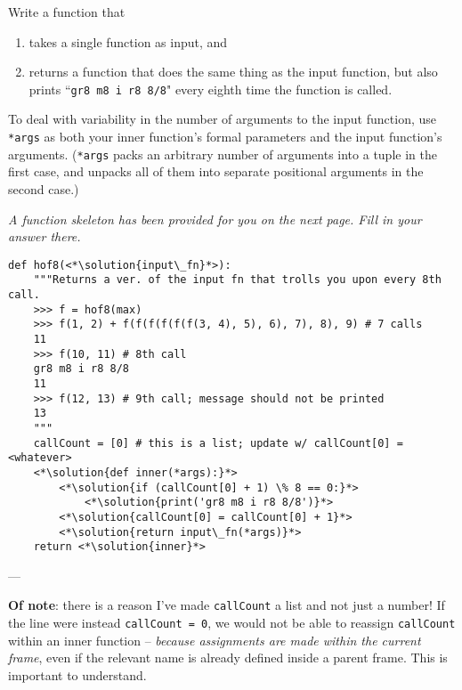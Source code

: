 \documentclass[twoside]{article}
\newcommand{\solution}[1]{{\color{red}#1}}
\begin{document}
\begin{enumerate}

Write a function that
\begin{enumerate}
\item takes a single function as input, and
\item returns a function that does the same thing as the input function, but also prints ``\texttt{gr8 m8 i r8 8/8}" every eighth time the function is called.
\end{enumerate}

To deal with variability in the number of arguments to the input function, use \texttt{*args} as both your inner function's formal parameters and the input function's arguments. (\texttt{*args} packs an arbitrary number of arguments into a tuple in the first case, and unpacks all of them into separate positional arguments in the second case.)

\textit{A function skeleton has been provided for you on the next page. Fill in your answer there.}

\newpage

\begin{lstlisting}
def hof8(<*\solution{input\_fn}*>):
    """Returns a ver. of the input fn that trolls you upon every 8th call.
    >>> f = hof8(max)
    >>> f(1, 2) + f(f(f(f(f(f(3, 4), 5), 6), 7), 8), 9) # 7 calls
    11
    >>> f(10, 11) # 8th call
    gr8 m8 i r8 8/8
    11
    >>> f(12, 13) # 9th call; message should not be printed
    13
    """
    callCount = [0] # this is a list; update w/ callCount[0] = <whatever>
    <*\solution{def inner(*args):}*>
        <*\solution{if (callCount[0] + 1) \% 8 == 0:}*>
            <*\solution{print('gr8 m8 i r8 8/8')}*>
        <*\solution{callCount[0] = callCount[0] + 1}*>
        <*\solution{return input\_fn(*args)}*>
    return <*\solution{inner}*>
\end{lstlisting}

---

\textbf{Of note}: there is a reason I've made \texttt{callCount} a list and not just a number! If the line were instead \texttt{callCount = 0}, we would not be able to reassign \texttt{callCount} within an inner function -- \textit{because assignments are made within the current frame}, even if the relevant name is already defined inside a parent frame. This is important to understand.

\end{enumerate}
\end{document}
